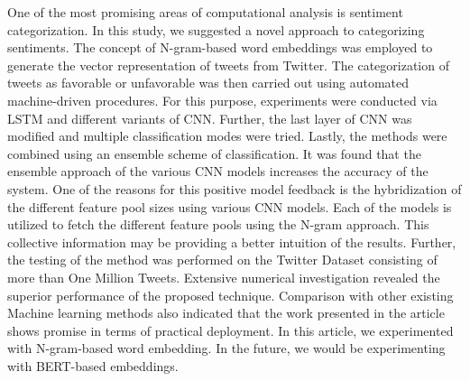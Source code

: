 One of the most promising areas of computational analysis is sentiment categorization.
In this study, we suggested a novel approach to categorizing sentiments. The concept of N-gram-based word embeddings was employed to generate the vector representation of tweets from Twitter.
The categorization of tweets as favorable or unfavorable was then carried out using automated machine-driven procedures. For this purpose, experiments were conducted via LSTM and different variants of CNN. Further, the last layer of CNN was modified and multiple classification modes were tried. Lastly, the methods were combined using an ensemble scheme of classification. It was found that the ensemble approach of the various CNN models increases the accuracy of the system. One of the reasons for this positive model feedback is the hybridization of the different feature pool sizes using various CNN models. Each of the models is utilized to fetch the different feature pools using the N-gram approach. This collective information may be providing a better intuition of the results. Further, the testing of the method was performed on the Twitter Dataset consisting of more than One Million Tweets. Extensive numerical investigation revealed the superior performance of the proposed technique. Comparison with other existing Machine learning methods also indicated that the work presented in the article shows promise in terms of practical deployment. In this article, we experimented with N-gram-based word embedding. In the future, we would be experimenting with BERT-based embeddings. 





%
 



